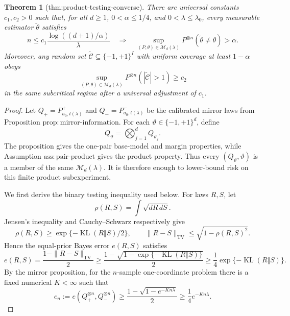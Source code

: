\documentclass{article}
\newtheorem{theorem}{Theorem}
\begin{document}
\begin{theorem}[thm:product-testing-converse]\label{thm:product-testing-converse}
There are universal constants \(c_1,c_2>0\) such that, for all \(d\ge1\), \(0<\alpha\le1/4\), and \(0<\lambda\le\lambda_0\), every measurable estimator \(\widetilde\theta\) satisfies \[n\le c_1\frac{\log((d+1)/\alpha)}{\lambda}\quad\Longrightarrow\quad\sup_{(P,\theta)\in\mathcal M_d(\lambda)}P^{\otimes n}(\widetilde\theta\ne\theta)>\alpha.\] Moreover, any random set \(\widetilde{\mathcal C}\subseteq\{-1,+1\}^I\) with uniform coverage at least \(1-\alpha\) obeys \[\sup_{(P,\theta)\in\mathcal M_d(\lambda)}P^{\otimes n}(|\widetilde{\mathcal C}|>1)\ge c_2\] in the same subcritical regime after a universal adjustment of \(c_1\).
\end{theorem}
\begin{proof}
Let \(Q_+=P^+_{a_0,t(\lambda)}\) and \(Q_-=P^-_{a_0,t(\lambda)}\) be the calibrated mirror laws from Proposition \(\mathrm{prop:mirror\text{-}information}\).  For each \(\vartheta\in\{-1,+1\}^d\), define
\[
Q_\vartheta=\bigotimes_{j=1}^d Q_{\vartheta_j}.
\]
The proposition gives the one-pair base-model and margin properties, while Assumption \(\mathrm{ass:pair\text{-}product}\) gives the product property.  Thus every \((Q_\vartheta,\vartheta)\) is a member of the same \(\mathcal M_d(\lambda)\).  It is therefore enough to lower-bound risk on this finite product subexperiment.

We first derive the binary testing inequality used below.  For laws \(R,S\), let
\[
\rho(R,S)=\int\sqrt{dR\,dS}.
\]
Jensen's inequality and Cauchy--Schwarz respectively give
\[
\rho(R,S)\ge \exp\{-\operatorname{KL}(R\Vert S)/2\},\qquad
\|R-S\|_{\mathrm{TV}}\le\sqrt{1-\rho(R,S)^2}.
\]
Hence the equal-prior Bayes error \(e(R,S)\) satisfies
\[
e(R,S)=\frac{1-\|R-S\|_{\mathrm{TV}}}{2}
\ge\frac{1-\sqrt{1-\exp\{-\operatorname{KL}(R\Vert S)\}}}{2}
\ge\frac14\exp\{-\operatorname{KL}(R\Vert S)\}.
\]
By the mirror proposition, for the \(n\)-sample one-coordinate problem there is a fixed numerical \(K<\infty\) such that
\[
e_n:=e(Q_+^{\otimes n},Q_-^{\otimes n})\ge
\frac{1-\sqrt{1-e^{-Kn\lambda}}}{2}\ge\frac14e^{-Kn\lambda}.
\]


\end{proof}
\end{document}
